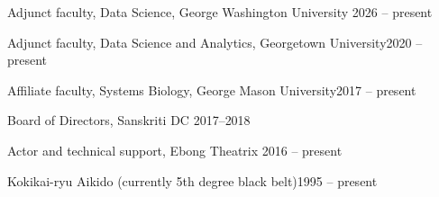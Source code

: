 Adjunct faculty, Data Science, George Washington University 	\hfill 2026 -- present

Adjunct faculty, Data Science and Analytics, Georgetown University\hfill 2020 -- present

Affiliate faculty, Systems Biology, George Mason University\hfill 2017 -- present

Board of Directors, Sanskriti DC	\hfill 2017--2018

Actor and technical support, Ebong Theatrix \hfill 2016 -- present

Kokikai-ryu Aikido (currently 5th degree black belt)\hfill 1995 -- present
